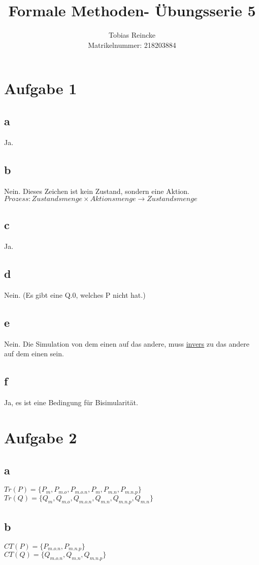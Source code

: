 \documentclass[]{article}
\title{Formale Methoden- Übungsserie 5}
\author{Tobias Reincke \\ Matrikelnummer: 218203884}
\begin{document}
\maketitle



\section{Aufgabe 1}
\subsection{a}
Ja.
\subsection{b}
Nein. Dieses Zeichen ist kein Zustand, sondern eine Aktion.\\ $Prozess: Zustandsmenge \times Aktionsmenge \to Zustandsmenge  $
\subsection{c}
Ja.
\subsection{d}
Nein. (Es gibt eine Q.0, welches P nicht hat.)
\subsection{e}
Nein. Die Simulation von dem einen auf das andere, muss \underline{invers} zu das andere auf dem einen sein.
\subsection{f}
Ja, es ist eine Bedingung für Bisimularität.

\section{Aufgabe 2 }
\subsection{a}
$Tr(P) = \{P_m, P_{m.o},P_{m.o.n}, P_m, P _ {m.n}, P_{m.n.p} \}$ \\
$Tr(Q)= \{Q_{m}, Q_{m.o},Q_{m.o.n},Q_{m.n},Q_{m.n.p},Q_{m.n}                                                                                                                                          \}  $
\subsection{b}
$CT(P)= \{            P_{m.o.n},      P_{m.n.p}                                                                                    \}    $\\
$CT(Q)= \{                Q_{m.o.n},Q_{m.n},Q_{m.n.p}                                                                                              \}$
\end{document}
